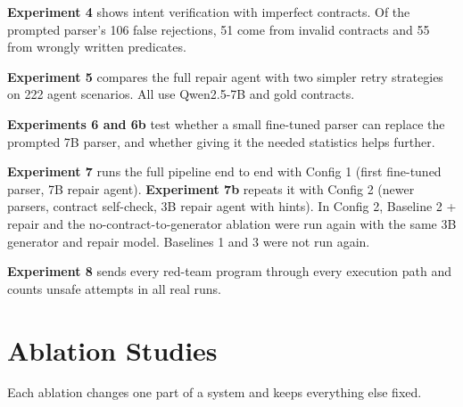 \documentclass[11pt]{article}
\begin{document}
\textbf{Experiment 4} shows intent verification with imperfect
contracts. Of the prompted parser's 106 false rejections, 51 come from
invalid contracts and 55 from wrongly written predicates.

\textbf{Experiment 5} compares the full repair agent with two simpler
retry strategies on 222 agent scenarios. All use Qwen2.5-7B and gold
contracts.

\textbf{Experiments 6 and 6b} test whether a small fine-tuned parser can
replace the prompted 7B parser, and whether giving it the needed
statistics helps further.

\textbf{Experiment 7} runs the full pipeline end to end with Config 1
(first fine-tuned parser, 7B repair agent). \textbf{Experiment 7b}
repeats it with Config 2 (newer parsers, contract self-check, 3B repair
agent with hints). In Config 2, Baseline 2 + repair and the
no-contract-to-generator ablation were run again with the same 3B
generator and repair model. Baselines 1 and 3 were not run again.

\textbf{Experiment 8} sends every red-team program through every
execution path and counts unsafe attempts in all real runs.

\section{Ablation Studies}

Each ablation changes one part of a system and keeps everything else
fixed.
\end{document}
